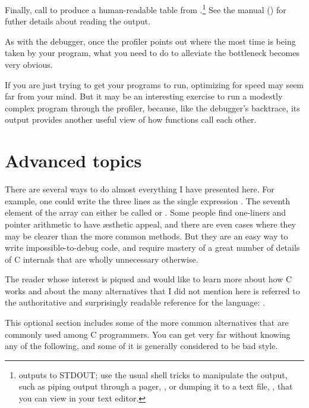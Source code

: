 \documentclass[12pt]{article}
\def\ind#1{\index{#1}#1}
\begin{document}
Finally, call  to produce a
human-readable table from .\footnote{
outputs to \ind{STDOUT}; use the usual shell tricks to manipulate
the output, such as piping output through a pager, , or dumping it to a text file, , that you can view in your text editor.}
See the manual () for futher details about reading
the output.

As with the debugger, once the profiler points out where the most time
is being taken by your program, what you need to do to alleviate the
bottleneck becomes very obvious.

If you are just trying to get your programs to run, optimizing for speed 
may seem far from your mind. But it may be an interesting exercise to
run a modestly complex program through the profiler, because, like the
debugger's backtrace, its output provides another useful view of how
functions call each other.

\section{\treesymbol{} Advanced topics}   
There are several ways to do almost everything I have presented here.  For
example, one could write the three lines  as the single expression . The seventh
element of the array  can either be called  or
.  Some people find one-liners and pointer arithmetic
to have \ae{}sthetic appeal, and there are even cases where they may
be clearer than the more common methods. But they are an easy way to
write impossible-to-debug code, and require mastery of a great number
of details of C internals that are wholly unnecessary otherwise.

The reader whose interest is piqued and would like to learn more about
how C works and about the many alternatives that I did not mention here
is referred to the authoritative and surprisingly readable reference
for the language: \cite{kandr:c}.

This optional section includes some of the more common alternatives that
are commonly used among C programmers. You can get very far without
knowing any of the following, and some of it is generally considered to
be bad style.
\end{document}
